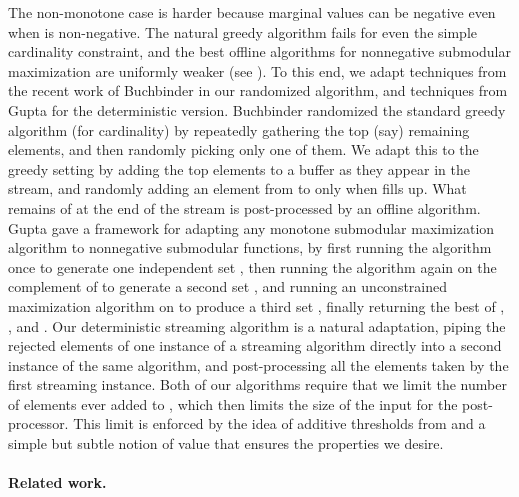 \documentclass[oneside,letterpaper]{scrartcl} \usepackage{macros}
\begin{document}
The non-monotone case is harder because marginal values can be
negative even when  is non-negative. The natural greedy algorithm
fails for even the simple cardinality constraint, and the best offline
algorithms for nonnegative submodular maximization are uniformly
weaker (see ).  To this end, we adapt techniques
from the recent work of Buchbinder \etal \cite{bfns-smcc-14} in our
randomized algorithm, and techniques from Gupta \etal \cite{grst-10}
for the deterministic version. Buchbinder \etal randomized the
standard greedy algorithm (for cardinality) by repeatedly gathering
the top (say)  remaining elements, and then randomly picking only
one of them. We adapt this to the greedy setting by adding the top
elements to a buffer  as they appear in the stream, and randomly
adding an element from  to  only when  fills up. What remains
of  at the end of the stream is post-processed by an offline
algorithm. Gupta \etal gave a framework for adapting any monotone
submodular maximization algorithm to nonnegative submodular functions,
by first running the algorithm once to generate one independent set
, then running the algorithm again on the complement of  to
generate a second set , and running an unconstrained maximization
algorithm on  to produce a third set , finally returning the
best of , , and . Our deterministic streaming algorithm
is a natural adaptation, piping the rejected elements of one instance
of a streaming algorithm directly into a second instance of the same
algorithm, and post-processing all the elements taken by the first
streaming instance. Both of our algorithms require that we limit the
number of elements ever added to , which then limits the size of
the input for the post-processor. This limit is enforced by the idea
of additive thresholds from \cite{bmkk-sso-14} and a simple but subtle
notion of value that ensures the properties we desire.



\iffalse ; if  is the current feasible solution at the beginning of
iteration and  is the set of
elements that can be added to  while maintaining feasibility,
greedy picks the element .  A special
case that illustrates the main ideas is the simple cardinality
constraint where the goal is to solve . In the
offline setting the greedy algorithm picks in each iteration the
element that \fi


\paragraph{Related work.}
\end{document}
